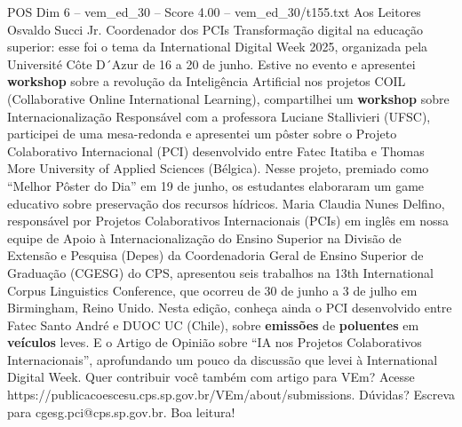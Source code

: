 \begin{textsample}{POS Dim 6 – vem\_ed\_30 – Score 4.00 – vem\_ed\_30/t155.txt}  \label{ex:f6_pos_101}
Aos Leitores Osvaldo Succi Jr.
Coordenador dos PCIs Transformação digital na educação superior: esse foi o tema da International Digital Week 2025, organizada pela Université Côte D´Azur de 16 a 20 de junho.
Estive no evento e apresentei \textbf{workshop} sobre a revolução da Inteligência Artificial nos projetos COIL (Collaborative Online International Learning), compartilhei um \textbf{workshop} sobre Internacionalização Responsável com a professora Luciane Stallivieri (UFSC), participei de uma mesa-redonda e apresentei um pôster sobre o Projeto Colaborativo Internacional (PCI) desenvolvido entre Fatec Itatiba e Thomas More University of Applied Sciences (Bélgica).
Nesse projeto, premiado como “Melhor Pôster do Dia” em 19 de junho, os estudantes elaboraram um game educativo sobre preservação dos recursos hídricos.
Maria Claudia Nunes Delfino, responsável por Projetos Colaborativos Internacionais (PCIs) em inglês em nossa equipe de Apoio à Internacionalização do Ensino Superior na Divisão de Extensão e Pesquisa (Depes) da Coordenadoria Geral de Ensino Superior de Graduação (CGESG) do CPS, apresentou seis trabalhos na 13th International Corpus Linguistics Conference, que ocorreu de 30 de junho a 3 de julho em Birmingham, Reino Unido.
Nesta edição, conheça ainda o PCI desenvolvido entre Fatec Santo André e DUOC UC (Chile), sobre \textbf{emissões} de \textbf{poluentes} em \textbf{veículos} leves.
E o Artigo de Opinião sobre “IA nos Projetos Colaborativos Internacionais”, aprofundando um pouco da discussão que levei à International Digital Week.
Quer contribuir você também com artigo para VEm?
Acesse https://publicacoescesu.cps.sp.gov.br/VEm/about/submissions.
Dúvidas?
Escreva para cgesg.pci@cps.sp.gov.br.
Boa leitura!

\end{textsample}
